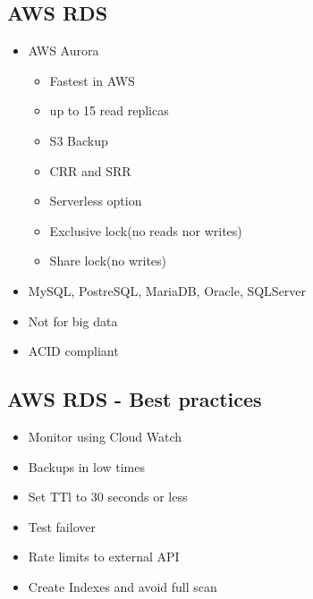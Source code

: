 \documentclass[../main.tex]{subfiles}
\begin{document}
\subsection{AWS RDS}
\begin{itemize}
    \item AWS Aurora
    \begin{itemize}
        \item Fastest in AWS
        \item up to 15 read replicas
        \item S3 Backup
        \item CRR and SRR
        \item Serverless option
        \item Exclusive lock(no reads nor writes)
        \item Share lock(no writes)
    \end{itemize}
    \item MySQL, PostreSQL, MariaDB, Oracle, SQLServer
    \item Not for big data
    \item ACID compliant
\end{itemize}

\subsection{AWS RDS - Best practices}
\begin{itemize}
    \item Monitor using Cloud Watch
    \item Backups in low times
    \item Set TTl to 30 seconds or less
    \item Test failover
    \item Rate limits to external API
    \item Create Indexes and avoid full scan
\end{itemize}
\end{document}
